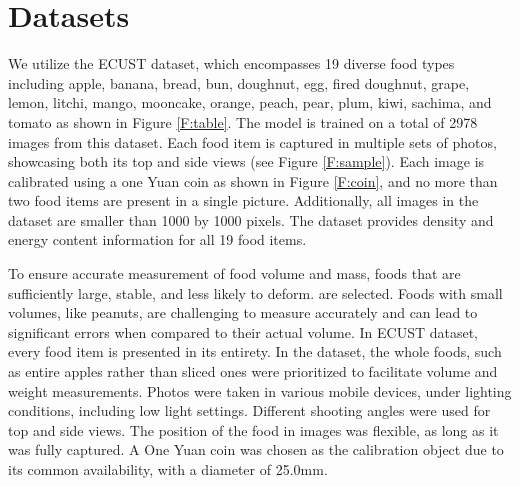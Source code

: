 \documentclass[12pt, a4paper, twoside]{article}
\begin{document}
\section{Datasets}
We utilize the ECUST dataset, which encompasses 19 diverse food types including apple, banana, bread, bun, doughnut, egg, fired doughnut, grape, lemon, litchi, mango, mooncake, orange, peach, pear, plum, kiwi, sachima, and tomato as shown in Figure \ref{F:table}. The model is trained on a total of 2978 images from this dataset. Each food item is captured in multiple sets of photos, showcasing both its top and side views (see Figure \ref{F:sample}). Each image is calibrated using a one Yuan coin as shown in Figure \ref{F:coin}, and no more than two food items are present in a single picture. Additionally, all images in the dataset are smaller than 1000 by 1000 pixels. The dataset provides density and energy content information for all 19 food items.
\par
To ensure accurate measurement of food volume and mass, foods that are sufficiently large, stable, and less likely to deform. are selected. Foods with small volumes, like peanuts, are challenging to measure accurately and can lead to significant errors when compared to their actual volume. In ECUST dataset, every food item is presented in its entirety. In the dataset, the whole foods, such as entire apples rather than sliced ones were prioritized to facilitate volume and weight measurements. Photos were taken in various mobile devices, under lighting conditions, including low light settings. Different shooting angles were used for top and side views. The position of the food in images was flexible, as long as it was fully captured. A One Yuan coin was chosen as the calibration object due to its common availability, with a diameter of 25.0mm.
\end{document}
